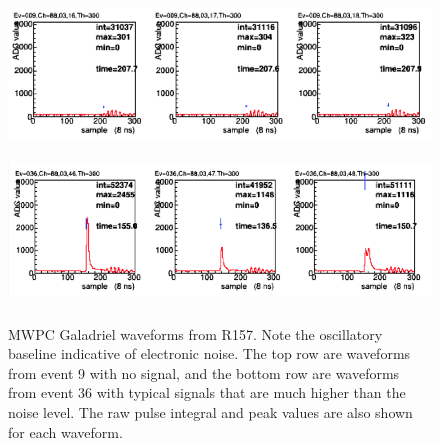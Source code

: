 \documentclass[12pt]{article}
\begin{document}
\begin{figure}[tbph]
\begin{center}
\includegraphics[height=4cm,clip=true]{Waveform_Galadriel_R157_Ev9}
\includegraphics[height=4cm,clip=true]{Waveform_Galadriel_R157_Ev36}
\caption{MWPC Galadriel waveforms from R157. Note the oscillatory baseline indicative of electronic noise. The top row are waveforms from event 9 with no signal, and the bottom row are waveforms from event 36 with typical signals that are much higher than the noise level. The raw pulse integral and peak values are
also shown for each waveform. 
\label{fig:Waveform_Galadriel_R157}}
\end{center}
\end{figure} 
\end{document}

